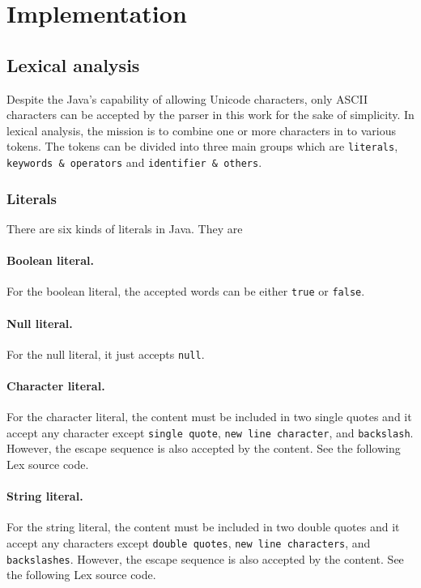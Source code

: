 \documentclass[12pt]{article}
\begin{document}
\section{Implementation}
\subsection{Lexical analysis}

Despite the Java's capability of allowing Unicode characters, only ASCII characters can be accepted by the parser in this work for the sake of simplicity. In lexical analysis, the mission is to combine one or more characters in to various tokens. The tokens can be divided into three main groups which are \texttt{literals}, \texttt{keywords \& operators} and \texttt{identifier \& others}. 

\subsubsection{Literals}

There are six kinds of literals in Java. They are

\paragraph{Boolean literal.}
For the boolean literal, the accepted words can be either \texttt{true} or \texttt{false}.
\paragraph{Null literal.}
For the null literal, it just accepts \texttt{null}.
\paragraph{Character literal.}
For the character literal, the content must be included in two single quotes and it accept any character except \texttt{single quote}, \texttt{new line character}, and \texttt{backslash}. However, the escape sequence is also accepted by the content. See the following Lex source code.

\paragraph{String literal.}
For the string literal, the content must be included in two double quotes and it accept any characters except \texttt{double quotes}, \texttt{new line characters}, and \texttt{backslashes}. However, the escape sequence is also accepted by the content. See the following Lex source code.

\end{document}

